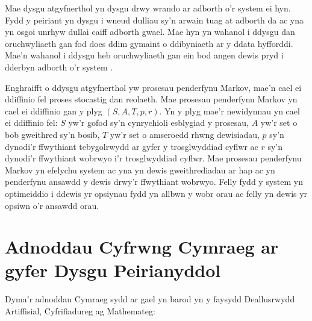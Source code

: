 Mae dysgu atgyfnerthol yn dysgu drwy wrando ar adborth o'r system ei hyn. Fydd y peiriant yn dysgu i wneud dulliau sy'n arwain tuag at adborth da ac yna yn osgoi unrhyw dullai caiff adborth gwael. Mae hyn yn wahanol i ddysgu dan oruchwyliaeth gan fod does ddim gymaint o ddibyniaeth ar y ddata hyfforddi. Mae'n wahanol i ddysgu heb oruchwyliaeth gan ein bod angen dewis pryd i dderbyn adborth o'r system \cite{technolegau-iaith}. 

Enghraifft o ddysgu atgyfnerthol yw prosesau penderfynu Markov, mae'n cael ei ddiffinio fel proses stocastig dan reolaeth. Mae prosesau penderfynu Markov yn cael ei ddiffinio gan y plyg $(S,A,T,p,r)$. Yn y plyg mae'r newidynnau yn cael ei ddiffinio fel: $S$ yw'r gofod sy'n cynrychioli esblygiad y prosesau, $A$ yw'r set o bob gweithred sy'n bosib, $T$ yw'r set o amseroedd rhwng dewisiadau, $p$ sy'n dynodi'r ffwythiant tebygolrwydd ar gyfer y trosglwyddiad cyflwr ac $r$ sy'n dynodi'r ffwythiant wobrwyo i'r trosglwyddiad cyflwr. Mae prosesau penderfynu Markov yn efelychu system ac yna yn dewis gweithrediadau ar hap ac yn penderfynu ansawdd y dewis drwy'r ffwythiant wobrwyo. Felly fydd y system yn optimeiddio i ddewis yr opsiynau fydd yn allbwn y wobr orau ac felly yn dewis yr opsiwn o'r ansawdd orau.\cite{PPM} 

\section{Adnoddau Cyfrwng Cymraeg ar gyfer Dysgu Peirianyddol}

Dyma'r adnoddau Cymraeg sydd ar gael yn barod yn y faysydd Deallusrwydd Artiffisial, Cyfrifiadureg ag Mathemateg:

